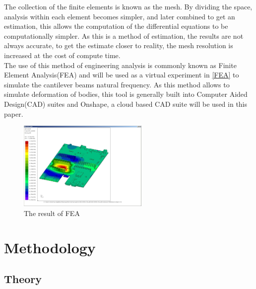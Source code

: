 \documentclass[a4paper,12pt]{article}
\begin{document}
    The collection of the finite elements is known as the mesh. By dividing the space, analysis within each element becomes simpler, and later combined to get an estimation, this allows the computation of the differential equations to be computationally simpler. As this is a method of estimation, the results are not always accurate, to get the estimate closer to reality, the mesh resolution is increased at the cost of compute time.\autocite{FEABook} \\
    The use of this method of engineering analysis is commonly known as Finite Element Analysis(FEA) and will be used as a virtual experiment in \ref{FEA} to simulate the cantilever beams natural frequency.
    As this method allows to simulate deformation of bodies, this tool is generally built into Computer Aided Design(CAD) suites and Onshape, a cloud based CAD suite will be used in this paper.\\
    \begin{figure}[b]
    \includegraphics[width=0.56\textwidth]{feaexample}
    \centering
    \caption{The result of FEA\autocite{feaexample}}
    \centering
    \end{figure}


\section{Methodology} \label{Methodology}%
    \subsection{Theory}\label{Theory}
    \pagebreak
\end{document}
